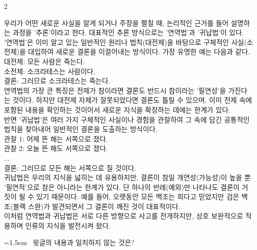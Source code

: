 \documentclass[10pt, a4paper]{article}
\begin{document}
\begin{multicols}{2}
\begin{passagebox}
\noindent{}우리가 어떤 새로운 사실을 알게 되거나 주장을 펼칠 때, 논리적인 근거를 들어 설명하는 과정을 '추론'이라고 한다. 대표적인 추론 방식으로는 '연역법'과 '귀납법'이 있다.
\\[0.5em]
'연역법'은 이미 알고 있는 일반적인 원리나 법칙(대전제)을 바탕으로 구체적인 사실(소전제)을 대입하여 새로운 결론을 이끌어내는 방식이다. 가장 유명한 예는 다음과 같다. \\
대전제: 모든 사람은 죽는다. \\
소전제: 소크라테스는 사람이다. \\
결론: 그러므로 소크라테스는 죽는다. \\
연역법의 가장 큰 특징은 전제가 참이라면 결론도 반드시 참이라는 '필연성'을 가진다는 것이다. 하지만 대전제 자체가 잘못되었다면 결론도 틀릴 수 있으며, 이미 전제 속에 포함된 내용을 확인하는 것이어서 새로운 지식을 확장하는 데에는 한계가 있다.
\\[0.5em]
반면 '귀납법'은 여러 가지 구체적인 사실이나 경험을 관찰하여 그 속에 담긴 공통적인 법칙을 찾아내어 일반적인 결론을 도출하는 방식이다. \\
관찰 1: 어제 뜬 해는 서쪽으로 졌다. \\
관찰 2: 오늘 뜬 해도 서쪽으로 졌다. \\
... \\
결론: 그러므로 모든 해는 서쪽으로 질 것이다. \\
귀납법은 우리의 지식을 넓히는 데 유용하지만, 결론이 참일 개연성(가능성)이 높을 뿐 '필연적'으로 참은 아니라는 한계가 있다. 단 하나의 반례(예외)만 나타나도 결론이 거짓이 될 수 있기 때문이다. 예를 들어, 오랫동안 모든 백조는 희다고 믿었지만 검은 백조(블랙 스완)가 발견되면서 그 결론이 깨진 것이 대표적이다.
\\[0.5em]
이처럼 연역법과 귀납법은 서로 다른 방향으로 사고를 전개하지만, 상호 보완적으로 작용하며 인류의 지식을 발전시켜 왔다.
\end{passagebox}
\vspace{1mm}

\noindent\begin{minipage}{\columnwidth}
\vspace{2mm}
{\hangindent=1.5em  ~윗글의 내용과 일치하지 않는 것은?\par}


\end{minipage}
\end{multicols}
\end{document}
